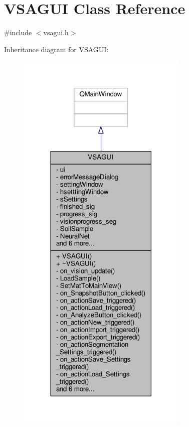 \hypertarget{class_v_s_a_g_u_i}{}\section{V\+S\+A\+G\+U\+I Class Reference}
\label{class_v_s_a_g_u_i}


{\ttfamily \#include $<$vsagui.\+h$>$}



Inheritance diagram for V\+S\+A\+G\+U\+I\+:\nopagebreak
\begin{figure}[H]
\begin{center}
\leavevmode
\includegraphics[width=230pt]{class_v_s_a_g_u_i__inherit__graph}
\end{center}
\end{figure}


